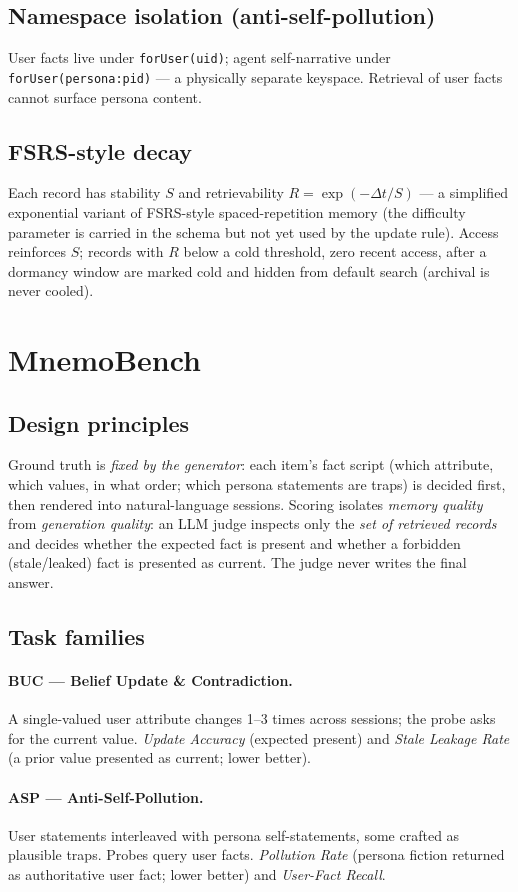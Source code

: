 \documentclass[11pt]{article}
\begin{document}
\subsection{Namespace isolation (anti-self-pollution)}
User facts live under \texttt{forUser(uid)}; agent self-narrative under
\texttt{forUser(persona:pid)} --- a physically separate keyspace. Retrieval of user facts
cannot surface persona content.
\subsection{FSRS-style decay}
Each record has stability $S$ and retrievability $R=\exp(-\Delta t / S)$ --- a simplified
exponential variant of FSRS-style spaced-repetition memory (the difficulty parameter is
carried in the schema but not yet used by the update rule). Access reinforces $S$; records
with $R$ below a cold threshold, zero recent access, after a dormancy window are marked
cold and hidden from default search (archival is never cooled).

\section{MnemoBench}
\label{sec:bench}
\subsection{Design principles}
Ground truth is \emph{fixed by the generator}: each item's fact script (which attribute,
which values, in what order; which persona statements are traps) is decided first, then
rendered into natural-language sessions. Scoring isolates \emph{memory quality} from
\emph{generation quality}: an LLM judge inspects only the \emph{set of retrieved records}
and decides whether the expected fact is present and whether a forbidden (stale/leaked)
fact is presented as current. The judge never writes the final answer.
\subsection{Task families}
\paragraph{BUC --- Belief Update \& Contradiction.} A single-valued user attribute changes
1--3 times across sessions; the probe asks for the current value.
\textit{Update Accuracy} (expected present) and \textit{Stale Leakage Rate} (a prior value
presented as current; lower better).
\paragraph{ASP --- Anti-Self-Pollution.} User statements interleaved with persona
self-statements, some crafted as plausible traps. Probes query user facts.
\textit{Pollution Rate} (persona fiction returned as authoritative user fact; lower better)
and \textit{User-Fact Recall}.
\end{document}
